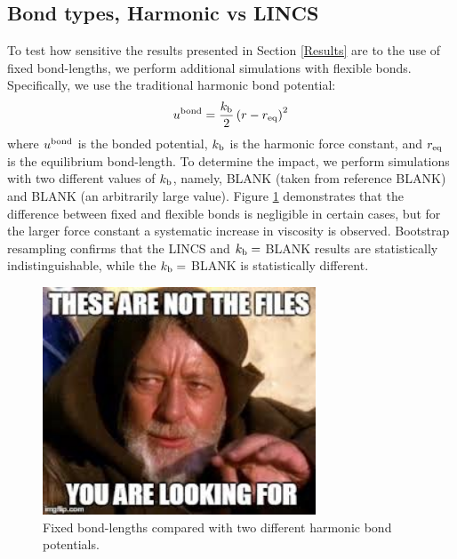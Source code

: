 \documentclass[preprint,review,12pt]{elsarticle}
\begin{document}
	\subsection{Bond types, Harmonic vs LINCS}
	
    To test how sensitive the results presented in Section \ref{Results} are to the use of fixed bond-lengths, we perform additional simulations with flexible bonds. Specifically, we use the traditional harmonic bond potential:
    \begin{equation} \label{eq:harmonic_bond}
    u^{\rm bond} = \frac{k_{\rm b}}{2} \left(r-r_{\rm eq}\right)^2
    \end{equation}
    where $u^{\rm bond}$ is the bonded potential, $k_{\rm b}$ is the harmonic force constant, and $r_{\rm eq}$ is the equilibrium bond-length. To determine the impact, we perform simulations with two different values of $k_{\rm b}$, namely, BLANK (taken from reference BLANK) and BLANK (an arbitrarily large value). Figure \ref{fig:fixed_flexible} demonstrates that the difference between fixed and flexible bonds is negligible in certain cases, but for the larger force constant a systematic increase in viscosity is observed. Bootstrap resampling confirms that the LINCS and $k_{\rm b} = $ BLANK results are statistically indistinguishable, while the $k_{\rm b} = $ BLANK is statistically different.

	\begin{figure}[htb!]
		\centering
		\includegraphics[width=3.2in]{empty_figure.jpg}
		\caption{Fixed bond-lengths compared with two different harmonic bond potentials.}
		\label{fig:fixed_flexible}
	\end{figure} 
	
	
\end{document}
